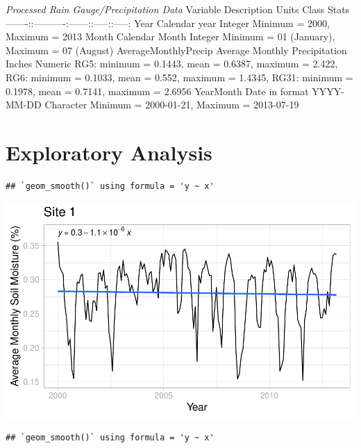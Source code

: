 \documentclass[
  12pt,
]{article}
\begin{document}
\emph{Processed Rain Gauge/Precipitation Data} \textbar Variable
\textbar{} Description \textbar{} Units \textbar{} Class \textbar{}
Stats
\textbar-------:\textbar:----------:\textbar------:\textbar:-----:\textbar:-----:\textbar{}
\textbar Year\textbar{} Calendar year \textbar{} \textbar{} Integer
\textbar{} Minimum = 2000, Maximum = 2013\textbar{}
\textbar Month\textbar{} Calendar Month \textbar{} \textbar{} Integer
\textbar{} Minimum = 01 (January), Maximum = 07 (August)\textbar{}
\textbar AverageMonthlyPrecip\textbar{} Average Monthly Precipitation
\textbar{} Inches \textbar{} Numeric \textbar{} RG5: minimum = 0.1443,
mean = 0.6387, maximum = 2.422, RG6: minimum = 0.1033, mean = 0.552,
maximum = 1.4345, RG31: minimum = 0.1978, mean = 0.7141, maximum =
2.6956 \textbar{} \textbar YearMonth\textbar{} Date in format YYYY-MM-DD
\textbar{} \textbar{} Character \textbar{} Minimum = 2000-01-21, Maximum
= 2013-07-19\textbar{}

\newpage

\hypertarget{exploratory-analysis}{%
\section{Exploratory Analysis}\label{exploratory-analysis}}

\begin{verbatim}
## `geom_smooth()` using formula = 'y ~ x'
\end{verbatim}

\includegraphics{Project_Template_files/figure-latex/Average Monthly Soil Moisture Plots-1.pdf}

\begin{verbatim}
## `geom_smooth()` using formula = 'y ~ x'
\end{verbatim}
\end{document}
